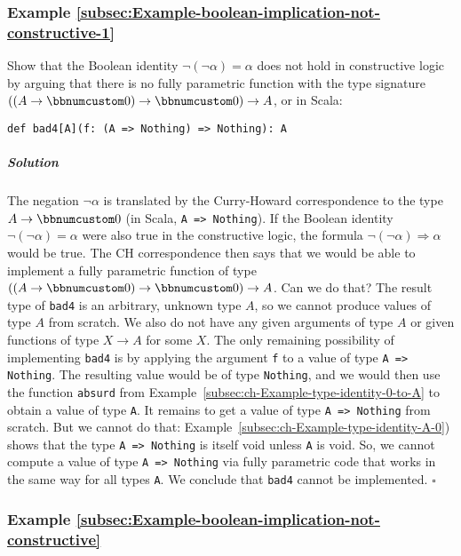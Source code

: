 \subsubsection{Example \label{subsec:Example-boolean-implication-not-constructive-1}\ref{subsec:Example-boolean-implication-not-constructive-1}}

Show that the Boolean identity $\neg\left(\neg\alpha\right)=\alpha$
does not hold in constructive logic by arguing that there is no fully
parametric function with the type signature $((A\rightarrow\bbnum 0)\rightarrow\bbnum 0)\rightarrow A$,
or in Scala:
\begin{lstlisting}
def bad4[A](f: (A => Nothing) => Nothing): A
\end{lstlisting}


\subparagraph{Solution}

The negation $\neg\alpha$ is translated by the Curry-Howard correspondence
to the type $A\rightarrow\bbnum 0$ (in Scala, \lstinline!A => Nothing!).
If the Boolean identity $\neg\left(\neg\alpha\right)=\alpha$ were
also true in the constructive logic, the formula $\neg(\neg\alpha)\Rightarrow\alpha$
would be true. The CH correspondence then says that we would be able
to implement a fully parametric function of type $((A\rightarrow\bbnum 0)\rightarrow\bbnum 0)\rightarrow A$.
Can we do that? The result type of \lstinline!bad4! is an arbitrary,
unknown type $A$, so we cannot produce values of type $A$ from scratch.
We also do not have any given arguments of type $A$ or given functions
of type $X\rightarrow A$ for some $X$. The only remaining possibility
of implementing \lstinline!bad4! is by applying the argument \lstinline!f!
to a value of type \lstinline!A => Nothing!. The resulting value
would be of type \lstinline!Nothing!, and we would then use the function
\lstinline!absurd! from Example~\ref{subsec:ch-Example-type-identity-0-to-A}
to obtain a value of type \lstinline!A!. It remains to get a value
of type \lstinline!A => Nothing! from scratch. But we cannot do that:
Example~\ref{subsec:ch-Example-type-identity-A-0}) shows that the
type \lstinline!A => Nothing! is itself void unless \lstinline!A!
is void. So, we cannot compute a value of type \lstinline!A => Nothing!
via fully parametric code that works in the same way for all types
\lstinline!A!. We conclude that \lstinline!bad4! cannot be implemented.
$\square$

\subsubsection{Example \label{subsec:Example-boolean-implication-not-constructive}\ref{subsec:Example-boolean-implication-not-constructive}}

